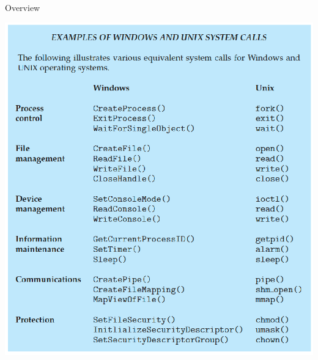 \documentclass[10pt]{beamer}
\begin{document}
\begin{frame}[allowframebreaks]{Overview}
\begin{center}
    \includegraphics[keepaspectratio, width=\textwidth, height=\textheight-2\baselineskip-2\baselineskip]{img/000_sys_calls.png} \\
\end{center}
\end{frame}
\end{document}
